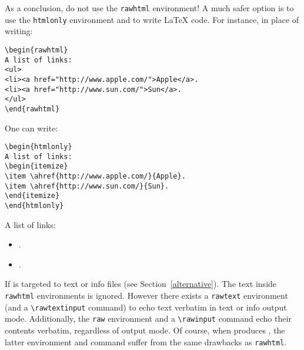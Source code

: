 As a conclusion, do not use the \texttt{rawhtml} environment!
A much safer option is to use the \texttt{htmlonly} environment
and to write \LaTeX{} code.
For instance, in place of writing:
\begin{verbatim}
\begin{rawhtml}
A list of links:
<ul>
<li><a href="http://www.apple.com/">Apple</a>.
<li><a href="http://www.sun.com/">Sun</a>.
</ul>
\end{rawhtml}
\end{verbatim}
One can write:
\begin{verbatim}
\begin{htmlonly}
A list of links:
\begin{itemize}
\item \ahref{http://www.apple.com/}{Apple}.
\item \ahref{http://www.sun.com/}{Sun}.
\end{itemize}
\end{htmlonly}
\end{verbatim}
\begin{htmlonly}
A list of links:
\begin{itemize}
\item {}.
\item {}.
\end{itemize}
\end{htmlonly}


If \hevea{} is targeted to text or info files (see
Section~\ref{alternative}).
The text inside \texttt{rawhtml} environments is ignored.
However there exists a \texttt{rawtext} environment (and a
\verb+\rawtextinput+ command) to echo text verbatim in text or info
output mode.
Additionally, the \texttt{raw} environment and a \verb+\rawinput+
command echo their contents verbatim, regardless of \hevea{} output
mode. Of course, when \hevea{} produces \html{},
the latter environment and command suffer from
the same drawbacks as \texttt{rawhtml}.


